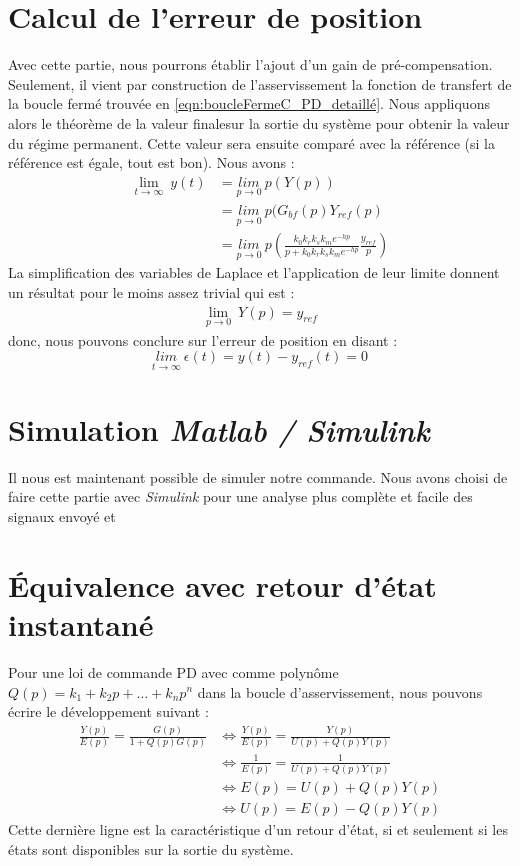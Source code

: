 \section{Calcul de l'erreur de position} 
Avec cette partie, nous pourrons établir l'ajout d'un gain de pré-compensation. Seulement, il vient par construction de l'asservissement la fonction de transfert de la boucle fermé trouvée en \ref{eqn:boucleFermeC_PD_detaillé}. Nous appliquons alors le théorème de la valeur finalesur la sortie du système pour obtenir la valeur du régime permanent. Cette valeur sera ensuite comparé avec la référence (si la référence est égale, tout est bon). Nous avons :
\begin{align*}
\underset{t\rightarrow \infty}{\lim}\ y(t) 	&= \underset{ p\rightarrow 0 }{lim} \ p(Y(p))\\
  											&= \underset{p\rightarrow 0}{lim}\ p(G_{bf}(p)Y_{ref}(p)\\
  											&= \underset{p\rightarrow 0}{lim}\ p \left(\frac{k_0k_rk_sk_me^{-hp}}{p+k_0k_rk_sk_me^{-hp}} \frac{y_{ref}}{p}\right)
\end{align*}
La simplification des variables de Laplace et l'application de leur limite donnent un résultat pour le moins assez trivial qui est :
\begin{align*}
\underset{p\rightarrow 0}{\lim}\ Y(p) = y_{ref}
\end{align*}
donc, nous pouvons conclure sur l'erreur de position en disant : 
\begin{equation}
\underset{t \rightarrow \infty}{lim}\ \epsilon(t) = y(t) - y_{ref}(t) = 0
\end{equation}

\section{Simulation \emph{Matlab / Simulink}}
Il nous est maintenant possible de simuler notre commande. Nous avons choisi de faire cette partie avec \emph{Simulink} pour une analyse plus complète et facile des signaux envoyé et 

\section{Équivalence avec retour d'état instantané}
Pour une loi de commande PD avec comme polynôme $Q(p) = k_1+k_2p+...+k_np^n$ dans la boucle d'asservissement, nous pouvons écrire le développement suivant : 
\begin{align*}
\frac{Y(p)}{E(p)} = \frac{G(p)}{1 + Q(p)G(p)} & \Leftrightarrow \frac{Y(p)}{E(p)} = \frac{Y(p)}{U(p) + Q(p)Y(p)}\\
&\Leftrightarrow \frac{1}{E(p)} = \frac{1}{U(p) + Q(p)Y(p)} \\
& \Leftrightarrow E(p) = U(p) + Q(p)Y(p)\\
& \Leftrightarrow U(p) = E(p) - Q(p)Y(p)
\end{align*} 
Cette dernière ligne est la caractéristique d'un retour d'état, si et seulement si les états sont disponibles sur la sortie du système.
